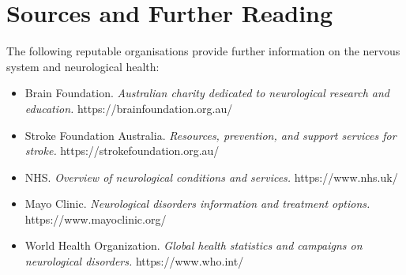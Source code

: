 \section*{Sources and Further Reading}
The following reputable organisations provide further information on the nervous system and neurological health:
\begin{itemize}
    \item Brain Foundation. \textit{Australian charity dedicated to neurological research and education.} https://brainfoundation.org.au/
    \item Stroke Foundation Australia. \textit{Resources, prevention, and support services for stroke.} https://strokefoundation.org.au/
    \item NHS. \textit{Overview of neurological conditions and services.} https://www.nhs.uk/
    \item Mayo Clinic. \textit{Neurological disorders information and treatment options.} https://www.mayoclinic.org/
    \item World Health Organization. \textit{Global health statistics and campaigns on neurological disorders.} https://www.who.int/
\end{itemize}
